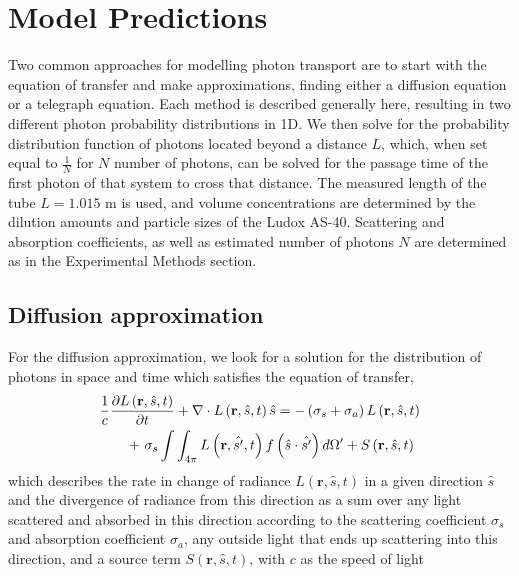 \documentclass[floatfix,aps,prl,reprint,groupedaddress]{revtex4-2}
\begin{document}
\section{Model Predictions}\label{sec:predictions}

Two common approaches for modelling photon transport are to start with the equation of transfer and make approximations, finding either a diffusion equation or a telegraph equation. Each method is described generally here, resulting in two different photon probability distributions in 1D. We then solve for the probability distribution function of photons located beyond a distance $L$, which, when set equal to $\frac{1}{N}$ for $N$ number of photons, can be solved for the passage time of the first photon of that system to cross that distance. The measured length of the tube $L = 1.015$ m is used, and volume concentrations are determined by the dilution amounts and particle sizes of the Ludox AS-40. Scattering and absorption coefficients, as well as estimated number of photons $N$ are determined as in the Experimental Methods section.


\subsection{Diffusion approximation}\label{subsec:diffusion}

For the diffusion approximation, we look for a solution for the distribution of photons in space and time which satisfies the equation of transfer,
\begin{gather}
    \frac{1}{c} \frac{\partial L \left(\mathbf{r},\hat{s},t\right)}{\partial t} + \mathbf{\nabla} \cdot L\left(\mathbf{r},\hat{s},t\right)\hat{s} = -\left(\sigma_{s} + \sigma_{a}\right) L\left(\mathbf{r},\hat{s},t\right) \notag\\
    \ \ \ \ \ +\ \sigma_{s} \int \int_{4\pi} L\left(\mathbf{r},\hat{s'},t\right) f\left(\hat{s} \cdot \hat{s'}\right) d\Omega' + S\left(\mathbf{r},\hat{s},t\right)\label{eq:RTE}
\end{gather}
which describes the rate in change of radiance $L\left(\mathbf{r},\hat{s},t\right)$ in a given direction $\hat{s}$ and the divergence of radiance from this direction as a sum over any light scattered and absorbed in this direction according to the scattering coefficient $\sigma_{s}$ and absorption coefficient $\sigma_{a}$, any outside light that ends up scattering into this direction, and a source term $S\left(\mathbf{r},\hat{s},t\right)$, with $c$ as the speed of light  \cite{haskell_boundary_1994,ishimaru_wave_nodate}
\end{document}
